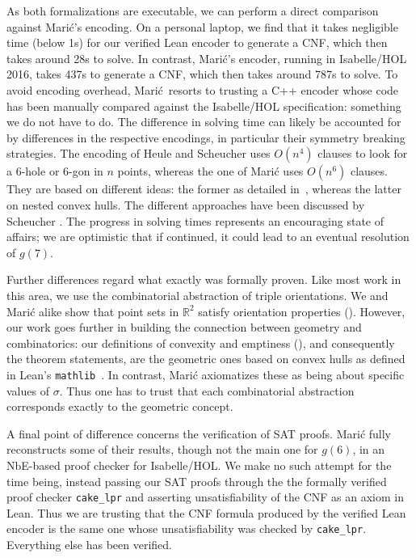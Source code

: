 As both formalizations are executable,
we can perform a direct comparison against Marić's encoding.
On a personal laptop,
we find that it takes negligible time (below 1s)
for our verified Lean encoder to generate a CNF,
which then takes around 28s to solve.
In contrast,
Marić's encoder, running in Isabelle/HOL 2016,
takes 437s to generate a CNF,
which then takes around 787s to solve.
To avoid encoding overhead,
Marić resorts to trusting a C++ encoder
whose code has been manually compared against the Isabelle/HOL specification:
something we do not have to do.
The difference in solving time
can likely be accounted for by differences in the respective encodings,
in particular their symmetry breaking strategies.
The encoding of Heule and Scheucher uses $O(n^4)$ clauses
to look for a $6$-hole or $6$-gon in $n$ points,
whereas the one of Marić uses $O(n^6)$ clauses.
They are based on different ideas:
the former as detailed in~,
whereas the latter on nested convex hulls.
The different approaches have been discussed by Scheucher \cite{scheucherTwoDisjoint5holes2020}.
The progress in solving times
represents an encouraging state of affairs;
we are optimistic that if continued,
it could lead to an eventual resolution of $g(7)$.

Further differences regard what exactly was formally proven.
Like most work in this area,
we use the combinatorial abstraction of triple orientations.
We and Marić alike show that point sets in $\mathbb R^2$
satisfy orientation properties ().
However, our work goes further in building the connection
between geometry and combinatorics:
our definitions of convexity and emptiness (),
and consequently the theorem statements,
are the geometric ones based on convex hulls
as defined in Lean's \texttt{mathlib}~\cite{The_mathlib_Community_2020}.
In contrast, Marić axiomatizes these as being about specific values of $\sigma$.
Thus one has to trust that each combinatorial abstraction
corresponds exactly to the geometric concept.

A final point of difference concerns the verification of SAT proofs.
Marić fully reconstructs some of their results,
though not the main one for $g(6)$,
in an NbE-based proof checker for Isabelle/HOL.
We make no such attempt for the time being,
instead passing our SAT proofs through the the formally verified proof checker \texttt{cake\_lpr} \cite{tanVerifiedPropagationRedundancy2023}
and asserting unsatisfiability of the CNF as an axiom in Lean.
Thus we are trusting that the CNF formula produced by the verified Lean encoder
is the same one whose unsatisfiability was checked by \texttt{cake\_lpr}.
Everything else has been verified.




